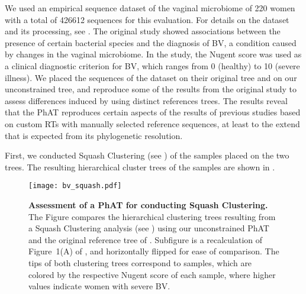 We used an empirical sequence dataset of the vaginal microbiome of 220 women
with a total of \num{426 612} sequences \citep{Srinivasan2012} for this evaluation.
For details on the dataset and its processing, see .
The original study showed associations between the presence of certain bacterial species
and the diagnosis of \acf{BV}, a condition caused by changes in the vaginal microbiome.
In the study, the Nugent score \citep{Nugent1991} was used as a clinical diagnostic criterion for \ac{BV},
which ranges from \num{0} (healthy) to \num{10} (severe illness).
We placed the sequences of the dataset on their original tree and on our unconstrained  tree,
and reproduce some of the results from the original study
to assess differences induced by using distinct references trees.
The results reveal that the \ac{PhAT} reproduces certain aspects of the results of previous studies
based on custom \acp{RT} with manually selected reference sequences,
at least to the extend that is expected from its phylogenetic resolution.

First, we conducted Squash Clustering \citep{Matsen2011a}
(see )
of the samples placed on the two trees.
The resulting hierarchical cluster trees of the samples are shown in .

\begin{figure}[hpbt]
    \centering
    \texttt{[image: bv\_squash.pdf]}
    \begin{subfigure}{0pt}
        \label{fig:bv_squash:sub:squash_art}
    \end{subfigure}
    \begin{subfigure}{0pt}
        \label{fig:bv_squash:sub:squash_orig}
    \end{subfigure}
    \caption[Assessment of a \acs{PhAT} for conducting Squash Clustering]{
        \textbf{Assessment of a \acs{PhAT} for conducting Squash Clustering.}
        The Figure compares the hierarchical clustering trees resulting from a Squash Clustering analysis
        (see )
        using   our unconstrained  \acs{PhAT} and
         the original reference tree of \citep{Srinivasan2012}.
        Subfigure  is a recalculation of Figure~1(A) of \citep{Srinivasan2012},
        and horizontally flipped for ease of comparison.
        The tips of both clustering trees correspond to samples,
        which are colored by the respective Nugent score of each sample,
        where higher values indicate women with severe \acl{BV}.
    }
    \label{fig:bv_squash}
\end{figure}

